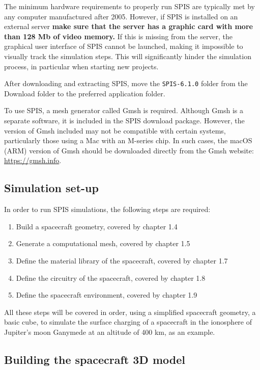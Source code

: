 \documentclass[a4paper, 11pt]{article}
\begin{document}
The minimum hardware requirements to properly run SPIS are typically met by any computer manufactured after 2005. However, if SPIS is installed on an external server \textbf{make sure that the server has a graphic card with more than 128 Mb of video memory.} If this is missing from the server, the graphical user interface of SPIS cannot be launched, making it impossible to visually track the simulation steps. This will significantly hinder the simulation process, in particular when starting new projects.\par
After downloading and extracting SPIS, move the \verb|SPIS-6.1.0| folder from the Download folder to the preferred application folder.\par
To use SPIS, a mesh generator called Gmsh is required. Although Gmsh is a separate software, it is included in the SPIS download package. However, the version of Gmsh included may not be compatible with certain systems, particularly those using a Mac with an M-series chip. In such cases, the macOS (ARM) version of Gmsh should be downloaded directly from the Gmsh website: \url{https://gmsh.info}.

\subsection{Simulation set-up}

In order to run SPIS simulations, the following steps are required:
\begin{enumerate}
    \item Build a spacecraft geometry, covered by chapter 1.4
    \item Generate a computational mesh, covered by chapter 1.5
    \item Define the material library of the spacecraft, covered by chapter 1.7
    \item Define the circuitry of the spacecraft, covered by chapter 1.8
    \item Define the spacecraft environment, covered by chapter 1.9
\end{enumerate}
All these steps will be covered in order, using a simplified spacecraft geometry, a basic cube, to simulate the surface charging of a spacecraft in the ionosphere of Jupiter's moon Ganymede at an altitude of 400 km, as an example.

\subsection{Building the spacecraft 3D model}
\end{document}
